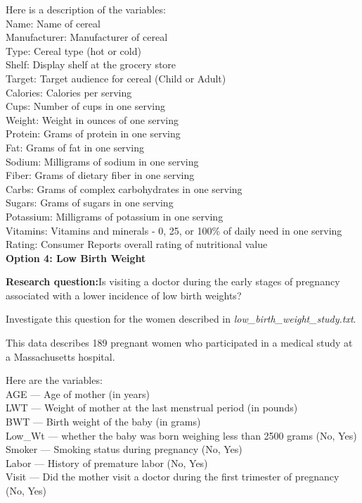 Here is a description of the variables: \\
Name:  Name of cereal \\
Manufacturer:  Manufacturer of cereal\\
Type:  Cereal type (hot or cold)\\
Shelf:  Display shelf at the grocery store\\
Target: Target audience for cereal (Child or Adult)\\
Calories:  Calories per serving\\
Cups:  Number of cups in one serving\\
Weight:  Weight in ounces of one serving\\
Protein:  Grams of protein in one serving\\
Fat:  Grams of fat in one serving\\
Sodium:  Milligrams of sodium in one serving\\
Fiber:  Grams of dietary fiber in one serving\\
Carbs:  Grams of complex carbohydrates in one serving\\
Sugars:  Grams of sugars in one serving\\
Potassium:  Milligrams of potassium in one serving\\
Vitamins:  Vitamins and minerals - 0, 25, or 100\% of daily need in one serving\\
Rating:  Consumer Reports overall rating of nutritional value  \\

\textbf{Option 4: Low Birth Weight} 

\textbf{Research question:}Is visiting a doctor during the early stages of pregnancy associated with a lower incidence of low birth weights? 

Investigate this question for the women described in \emph{low\_birth\_weight\_study.txt}. 

This data describes 189 pregnant women who participated in a medical study at a Massachusetts hospital.

Here are the variables: \\
AGE --- Age of mother (in years)\\
LWT --- Weight of mother at the last menstrual period (in pounds)\\
BWT --- Birth weight of the baby (in grams)\\
Low\_Wt --- whether the baby was born weighing less than 2500 grams (No, Yes)\\
Smoker --- Smoking status during pregnancy (No, Yes)\\
Labor --- History of premature labor (No, Yes)\\
Visit --- Did the mother visit a doctor during the first trimester of pregnancy (No, Yes)\\
\newpage

